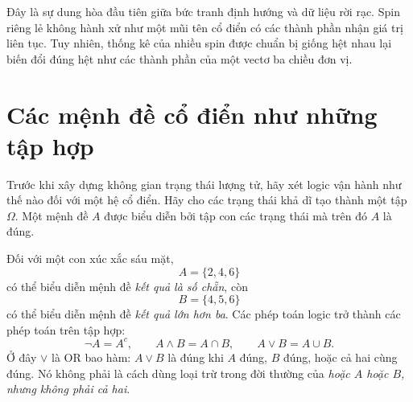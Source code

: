 \begin{classroomqa}
\end{classroomqa}

Đây là sự dung hòa đầu tiên giữa bức tranh định hướng và dữ liệu rời rạc. Spin riêng lẻ không hành xử như một mũi tên cổ điển có các thành phần nhận giá trị liên tục. Tuy nhiên, thống kê của nhiều spin được chuẩn bị giống hệt nhau lại biến đổi đúng hệt như các thành phần của một vectơ ba chiều đơn vị.

\section{Các mệnh đề cổ điển như những tập hợp}

Trước khi xây dựng không gian trạng thái lượng tử, hãy xét logic vận hành như thế nào đối với một hệ cổ điển. Hãy cho các trạng thái khả dĩ tạo thành một tập \(\Omega\). Một mệnh đề \(A\) được biểu diễn bởi tập con các trạng thái mà trên đó \(A\) là đúng.

Đối với một con xúc xắc sáu mặt,
\[
A=\{2,4,6\}
\]
có thể biểu diễn mệnh đề \emph{kết quả là số chẵn}, còn
\[
B=\{4,5,6\}
\]
có thể biểu diễn mệnh đề \emph{kết quả lớn hơn ba}. Các phép toán logic trở thành các phép toán trên tập hợp:
\begin{equation}
\neg A=A^c,\qquad
A\land B=A\cap B,\qquad
A\lor B=A\cup B.
\label{eq:classical-logic}
\end{equation}
Ở đây \(\lor\) là OR bao hàm: \(A\lor B\) là đúng khi \(A\) đúng, \(B\) đúng, hoặc cả hai cùng đúng. Nó không phải là cách dùng loại trừ trong đời thường của \emph{hoặc \(A\) hoặc \(B\), nhưng không phải cả hai}.

\begin{classroomqa}
\end{classroomqa}

